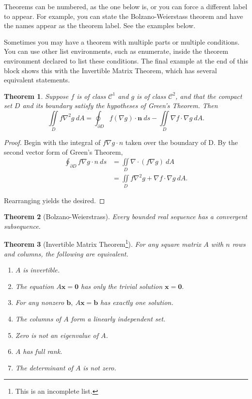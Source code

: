 Theorems can be numbered, as the one below is, or you can force a different label to appear. For example, you can state the Bolzano-Weierstass theorem and have the names appear as the theorem label. See the examples below.

Sometimes you may have a theorem with multiple parts or multiple conditions. You can use other list environments, such as enumerate, inside the theorem environment declared to list these conditions. The final example at the end of this block shows this with the Invertible Matrix Theorem, which has several equivalent statements.

\newtheorem{thm}{Theorem}
\begin{thm}
	Suppose $f$ is of class $\mathcal{C}^1$ and $g$ is of class $\mathcal{C}^2$, and that the compact set $D$ and its boundary satisfy the hypotheses of Green's Theorem.  Then
	\[ \iint \limits_D f\nabla^2 g \ dA = \oint_{\partial D} f(\nabla g) \cdot \mathbf{n} \ ds - \iint \limits_D \nabla f \cdot \nabla g \ dA . \]
\end{thm}

\begin{proof}
	Begin with the integral of $f\nabla g \cdot n$ taken over the boundary of D.  By the second vector form of Green's Theorem,
	\begin{align*}
		\oint_{\partial D} f\nabla g \cdot n \ ds & = \iint \limits_D \nabla \cdot (f\nabla g) \ dA               \\
		                                          & = \iint \limits_D f\nabla^2 g + \nabla f \cdot \nabla g \ dA.
	\end{align*}

	Rearranging yields the desired.
\end{proof}

\begin{thm}[Bolzano-Weierstrass]
	Every bounded real sequence has a convergent subsequence.
\end{thm}

\begin{thm}[Invertible Matrix Theorem\footnote{This is an incomplete list.}]
	For any square matrix $A$ with $n$ rows and columns, the following are equivalent.
	\begin{enumerate}
		\item $A$ is invertible.
		\item The equation $A\mathbf{x}=\mathbf{0}$ has only the trivial solution $\mathbf{x} = \mathbf{0}.$
		\item For any nonzero $\mathbf{b}, \ A\mathbf{x} = \mathbf{b}$ has exactly one solution.
		\item The columns of $A$ form a linearly independent set.
		\item Zero is not an eigenvalue of $A$.
		\item $A$ has full rank.
		\item The determinant of $A$ is not zero.
	\end{enumerate}
\end{thm}

